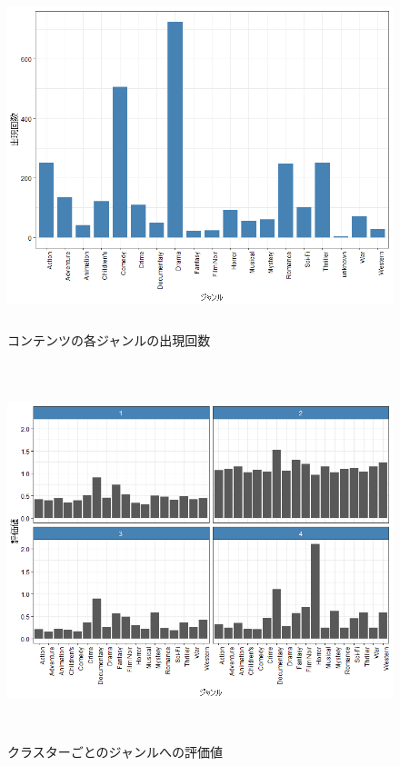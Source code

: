 \documentclass[a4j,12pt]{jarticle}
\begin{document}
\begin{figure}[H]
\begin{center}
\includegraphics[clip,height= 100mm]{data/genre_count.png}
\end{center}
\caption{コンテンツの各ジャンルの出現回数}
\label{genre_count}
\end{figure}

\begin{figure}[H]
\begin{center}
\includegraphics[clip,height= 110mm]{data/cluster_plot.png}
\end{center}
\caption{クラスターごとのジャンルへの評価値}
\label{clustergenre}
\end{figure}
\end{document}
